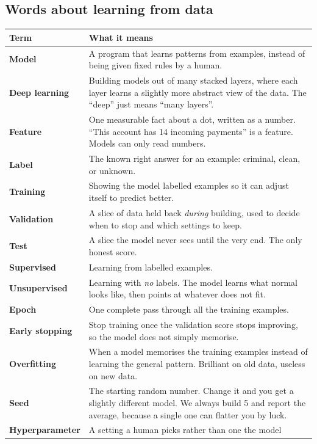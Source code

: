 \documentclass[11pt,a4paper]{article}
\begin{document}
\subsection{Words about learning from data}

\begin{longtable}{@{}p{4.1cm}p{11.4cm}@{}}
\toprule
\textbf{Term} & \textbf{What it means} \\
\midrule
\endhead
\textbf{Model} & A program that learns patterns from examples, instead of being
given fixed rules by a human. \\
\textbf{Deep learning} & Building models out of many stacked layers, where each
layer learns a slightly more abstract view of the data. The ``deep'' just means
``many layers''. \\
\textbf{Feature} & One measurable fact about a dot, written as a number.
``This account has 14 incoming payments'' is a feature. Models can only read
numbers. \\
\textbf{Label} & The known right answer for an example: criminal, clean, or
unknown. \\
\textbf{Training} & Showing the model labelled examples so it can adjust itself
to predict better. \\
\textbf{Validation} & A slice of data held back \emph{during} building, used to
decide when to stop and which settings to keep. \\
\textbf{Test} & A slice the model never sees until the very end. The only honest
score. \\
\textbf{Supervised} & Learning from labelled examples. \\
\textbf{Unsupervised} & Learning with \emph{no} labels. The model learns what
normal looks like, then points at whatever does not fit. \\
\textbf{Epoch} & One complete pass through all the training examples. \\
\textbf{Early stopping} & Stop training once the validation score stops
improving, so the model does not simply memorise. \\
\textbf{Overfitting} & When a model memorises the training examples instead of
learning the general pattern. Brilliant on old data, useless on new data. \\
\textbf{Seed} & The starting random number. Change it and you get a slightly
different model. We always build 5 and report the average, because a single one
can flatter you by luck. \\
\textbf{Hyperparameter} & A setting a human picks rather than one the model

\end{longtable}
\end{document}
